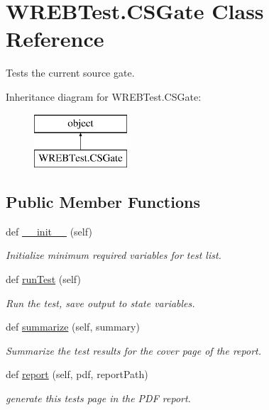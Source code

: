 \hypertarget{class_w_r_e_b_test_1_1_c_s_gate}{}\section{W\+R\+E\+B\+Test.\+C\+S\+Gate Class Reference}
\label{class_w_r_e_b_test_1_1_c_s_gate}


Tests the current source gate.  


Inheritance diagram for W\+R\+E\+B\+Test.\+C\+S\+Gate\+:\begin{figure}[H]
\begin{center}
\leavevmode
\includegraphics[height=2.000000cm]{class_w_r_e_b_test_1_1_c_s_gate}
\end{center}
\end{figure}
\subsection*{Public Member Functions}
\begin{DoxyCompactItemize}
\item 
def \hyperlink{class_w_r_e_b_test_1_1_c_s_gate_a1ef42c27062a4336a6e38153f0d63f22}{\+\_\+\+\_\+init\+\_\+\+\_\+} (self)
\begin{DoxyCompactList}\small\item\em Initialize minimum required variables for test list. \end{DoxyCompactList}\item 
def \hyperlink{class_w_r_e_b_test_1_1_c_s_gate_a2022ca5cfd0cca5dc1e68c96bee503e5}{run\+Test} (self)
\begin{DoxyCompactList}\small\item\em Run the test, save output to state variables. \end{DoxyCompactList}\item 
def \hyperlink{class_w_r_e_b_test_1_1_c_s_gate_ace80c551527bc66602b517fa0891ae55}{summarize} (self, summary)
\begin{DoxyCompactList}\small\item\em Summarize the test results for the cover page of the report. \end{DoxyCompactList}\item 
def \hyperlink{class_w_r_e_b_test_1_1_c_s_gate_ac312d7c72d68c12df3262beec216dd70}{report} (self, pdf, report\+Path)
\begin{DoxyCompactList}\small\item\em generate this test\textquotesingle{}s page in the P\+DF report. \end{DoxyCompactList}\end{DoxyCompactItemize}


